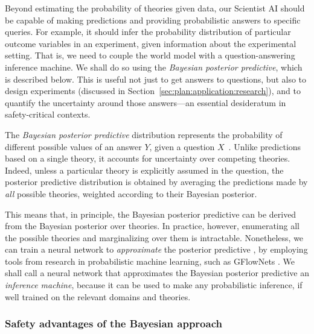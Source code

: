 Beyond estimating the probability of theories given data, our Scientist AI should be capable of making predictions and providing probabilistic answers to specific queries. For example, it should infer the probability distribution of particular outcome variables in an experiment, given information about the experimental setting. That is, we need to couple the world model with a question-answering inference machine. We shall do so using the \textit{Bayesian posterior predictive}, which is described below. This is useful not just to get answers to questions, but also to design experiments (discussed in Section~\ref{sec:plan:application:research}), and to quantify the uncertainty around those answers---an essential desideratum in safety-critical contexts.

The \textit{Bayesian posterior predictive} distribution represents the probability of different possible values of an answer $Y$, given a question $X$~\cite{probml.github.io.pml.book.book1.html}. Unlike predictions based on a single theory, it accounts for uncertainty over competing theories. Indeed, unless a particular theory is explicitly assumed in the question, the posterior predictive distribution is obtained by averaging the predictions made by \emph{all} possible theories, weighted according to their Bayesian posterior.

This means that, in principle, the Bayesian posterior predictive can be derived from the Bayesian posterior over theories. In practice, however, enumerating all the possible theories and marginalizing over them is intractable. Nonetheless, we can train a neural network to \emph{approximate} the posterior predictive \cite{pubs.rsc.org.en.content.articlehtml.2023.dd.d3dd00002h}, by employing tools from research in probabilistic machine learning, such as GFlowNets \cite{proceedings.neurips.cc.paper.files.paper.2023.hash.639a9a172c044fbb64175b5fad42e9a5.Abstract.Conference.html}. We shall call a neural network that approximates the Bayesian posterior predictive an \textit{inference machine}, because it can be used to make any probabilistic inference, if well trained on the relevant domains and theories.

    \subsubsection{Safety advantages of the Bayesian approach}
    \label{sec:plan:bayesian:safetyadvantages}
    
